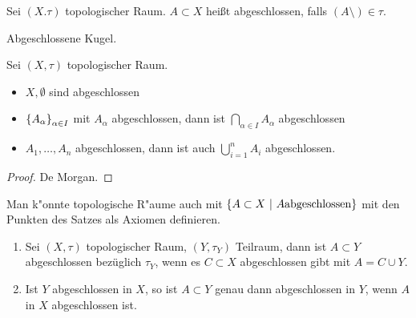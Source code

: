 \documentclass{skript}
\begin{document}
\begin{dfn}
    Sei $(X. \tau)$ topologischer Raum. $A\subset X$ hei\ss{}t abgeschlossen,
    falls $(A\setminus)\in\tau$.
\end{dfn}

\begin{bsp}
    Abgeschlossene Kugel.
\end{bsp}

\begin{stz}[Dualsatz]
    Sei $(X,\tau)$ topologischer Raum.
    \begin{itemize}
        \item $X, \emptyset$ sind abgeschlossen
        \item $\mdef{A_\alpha}_{\alpha\in I}$ mit $A_\alpha$ abgeschlossen, dann ist
            $\bigcap_{\alpha\in I} A_\alpha$ abgeschlossen
        \item $A_1,\ldots, A_n$ abgeschlossen, dann ist auch $\bigcup_{i=1}^n A_i$
            abgeschlossen.
    \end{itemize}
    \begin{proof}
        De Morgan.
    \end{proof}
    \begin{bem}
        Man k"onnte topologische R"aume auch mit $\mdef[A\subset X]{A\mathrm{
        abgeschlossen}}$ mit den Punkten des Satzes als Axiomen definieren.
    \end{bem}
\end{stz}

\begin{lem}
    \begin{enumerate}
        \item Sei $(X,\tau)$ topologischer Raum, $(Y,\tau_Y)$ Teilraum, dann ist
            $A\subset Y$ abgeschlossen bezüglich $\tau_Y$, wenn es $C\subset X$
            abgeschlossen gibt mit $A=C\cup Y$.
        \item Ist $Y$ abgeschlossen in $X$, so ist $A\subset Y$ genau dann abgeschlossen
            in $Y$, wenn $A$ in $X$ abgeschlossen ist.
    \end{enumerate}
\end{lem}
\end{document}
